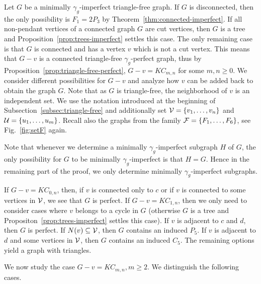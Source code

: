 \documentclass[12pt]{article}
\newcommand{\proof}{\noindent{\bf Proof.\ }}
\newcommand{\cF}{{\cal F}}
\newcommand{\cU}{{\cal U}}
\newcommand{\cV}{{\cal V}}
\begin{document}
\proof
Let $G$ be a minimally $\gamma_g$-imperfect triangle-free graph. If $G$ is disconnected, then the only possibility is $F_1 = 2 P_3$ by Theorem~\ref{thm:connected-imperfect}. If all non-pendant vertices of a connected graph $G$ are cut vertices, then $G$ is a tree and Proposition~\ref{prop:trees-imperfect} settles this case. The only remaining case is that $G$ is connected and has a vertex $v$ which is not a cut vertex. This means that $G-v$ is a connected triangle-free $\gamma_g$-perfect graph, thus by Proposition~\ref{prop:triangle-free-perfect}, $G-v = KC_{m,n}$ for some $m,n\geq 0$. We consider different possibilities for $G-v$ and analyze how $v$ can be added back to obtain the graph $G$. Note that as $G$ is triangle-free, the neighborhood of $v$ is an independent set. We use the notation introduced at the beginning of Subsection~\ref{subsec:triangle-free} and additionally set $\cV = \{v_1, \ldots, v_n\}$ and $\cU = \{ u_1, \ldots, u_m \}$. Recall also the graphs from the family $\cF = \{ F_1, \ldots, F_6\}$, see Fig.~\ref{fig:setF} again.

Note that whenever we determine a minimally $\gamma_g$-imperfect subgraph $H$ of $G$, the only possibility for $G$ to be minimally $\gamma_g$-imperfect is that $H = G$. Hence in the remaining part of the proof, we only determine minimally $\gamma_g$-imperfect subgraphs. 

If $G-v = KC_{0,n}$, then, if $v$ is connected only to $c$ or if $v$ is connected to some vertices in $\cV$, we see that $G$ is perfect. If $G-v = KC_{1,n}$, then we only need to consider cases where $v$ belongs to a cycle in $G$ (otherwise $G$ is a tree and Propositon~\ref{prop:trees-imperfect} settles this case). If $v$ is adjacent to $c$ and $d$, then $G$ is perfect. If $N(v) \subseteq \cV$, then $G$ contains an induced $P_5$. If $v$ is adjacent to $d$ and some vertices in $\cV$, then $G$ contains an induced $C_5$. The remaining options yield a graph with triangles.

We now study the case $G-v = KC_{m,n}, m \geq 2$. We distinguish the following cases.
\end{document}
